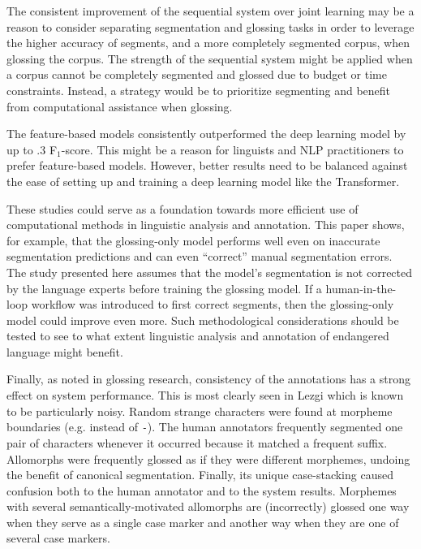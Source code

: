 The consistent improvement of the sequential system over joint learning may be a reason to consider separating segmentation and glossing tasks in order to leverage the higher accuracy of segments, and a more completely segmented corpus, when glossing the corpus. 
The strength of the sequential system might be applied when a corpus cannot be completely segmented and glossed due to budget or time constraints. Instead, a strategy would be to prioritize segmenting and benefit from computational assistance when glossing. 

The feature-based models consistently outperformed the deep learning model by up to .3 F$_1$-score. This might be a reason for linguists and NLP practitioners to prefer feature-based models. However, better results need to be balanced against the ease of setting up and training a deep learning model like the Transformer. 

These studies could serve as a foundation towards more efficient use of computational methods in linguistic analysis and annotation. This paper shows, for example, that the glossing-only model performs well even on inaccurate segmentation predictions and can even ``correct'' manual segmentation errors. The study presented here assumes that the model's segmentation is not corrected by the language experts before training the glossing model. If a human-in-the-loop workflow was introduced to first correct segments, then the glossing-only model could improve even more. Such methodological considerations should be tested to see to what extent linguistic analysis and annotation of endangered language might benefit.

Finally, as \citet{mcmillan-major_automating_2020} noted in glossing research, consistency of the annotations has a strong effect on system performance. This is most clearly seen in Lezgi which is known to be particularly noisy. Random strange characters were found at morpheme boundaries (e.g. {\tt *} instead of  {\tt -}). The human annotators frequently segmented one pair of characters whenever it occurred because it matched a frequent suffix. Allomorphs were frequently glossed as if they were different morphemes, undoing the benefit of canonical segmentation. Finally, its unique case-stacking caused confusion both to the human annotator and to the system results. Morphemes with several semantically-motivated allomorphs are (incorrectly) glossed one way when they serve as a single case marker and another way when they are one of several case markers.


